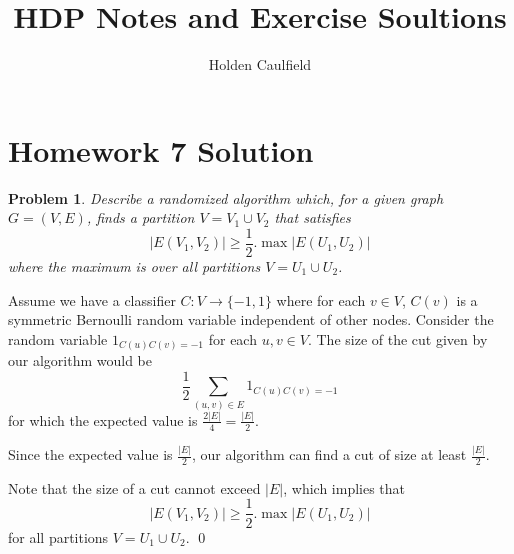 \documentclass[12pt]{article}
\title{HDP Notes and Exercise Soultions}
\author{Holden Caulfield}
\newtheorem{ex}{Problem}
\begin{document}
\centering	\section*{Homework 7 Solution}

\begin{bx}
	
	\begin{ex}
	Describe a randomized algorithm which, for a given graph $G=(V,E)$, finds a partition $V = V_1 \cup V_2$ that satisfies
	\[
	\left | E(V_1,V_2)\right | \ge \frac{1}{2}.\max\left | E(U_1,U_2)\right | 
	\]
	where the maximum is over all partitions $V = U_1 \cup U_2$.
	\end{ex}
	\tcblower
Assume we have a classifier $C:V \rightarrow \{-1,1\}$ where for each $v\in V$, $C(v)$ is a symmetric Bernoulli random variable independent of other nodes. Consider the random variable $1_{C(u)C(v)=-1}$ for each $u,v \in V$.
The size of the cut given by our algorithm would be 
\[
\frac{1}{2}\sum_{(u,v)\in E}1_{C(u)C(v)=-1}
\]
for which the expected value is $\frac{2|E|}{4}=\frac{|E|}{2}$.

Since the expected value is $\frac{|E|}{2}$, our algorithm can find a cut of size at least $\frac{|E|}{2}$.

Note that the size of a cut cannot exceed $|E|$, which implies that 
\[
\left | E(V_1,V_2)\right | \ge \frac{1}{2}.\max\left | E(U_1,U_2)\right | 
\]
for all partitions $V=U_1 \cup U_2$.
\qed
\end{bx}
\end{document}
